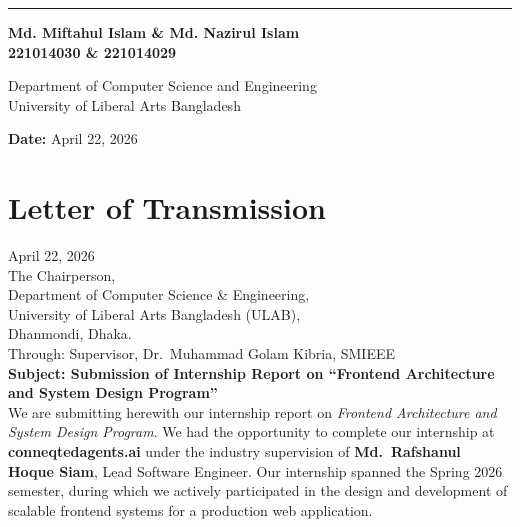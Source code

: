 \documentclass[12pt, oneside, a4paper]{book}
\begin{document}
\begin{center}
\rule{0.60\textwidth}{0.4pt}

\vspace{0.25cm}

\begin{flushleft}
  \textbf{Md. Miftahul Islam \& Md. Nazirul Islam}\\[2pt]
  \textbf{221014030 \& 221014029}
\end{flushleft}

\vspace{0.7cm}

Department of Computer Science and Engineering\\
University of Liberal Arts Bangladesh

\vspace{0.5cm}

\textbf{Date:} April 22, 2026

\end{center}

\newpage
{}
\thispagestyle{empty}

\section*{Letter of Transmission}

\noindent April 22, 2026 \\[0.5cm]

\noindent The Chairperson,\\
Department of Computer Science \& Engineering,\\
University of Liberal Arts Bangladesh (ULAB),\\
Dhanmondi, Dhaka.\\[0.5cm]

\noindent Through: Supervisor, Dr.\ Muhammad Golam Kibria, SMIEEE\\[0.5cm]

\noindent \textbf{Subject: Submission of Internship Report on ``Frontend Architecture and System Design Program''}\\[0.5cm]

We are submitting herewith our internship report on \textit{Frontend Architecture and
System Design Program}. We had the opportunity to complete our internship at
\textbf{conneqtedagents.ai} under the industry supervision of \textbf{Md.\ Rafshanul
Hoque Siam}, Lead Software Engineer. Our internship spanned the Spring 2026 semester,
during which we actively participated in the design and development of scalable frontend
systems for a production web application.
\end{document}
